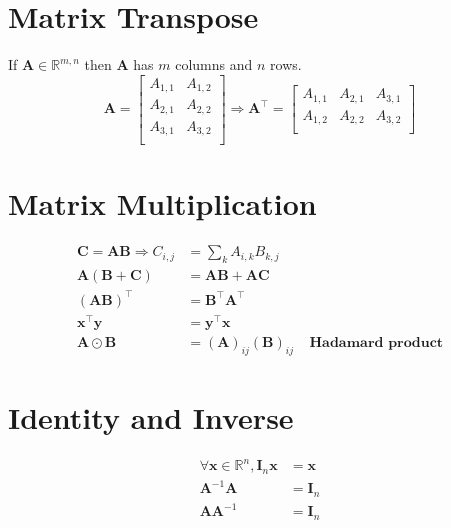 \documentclass[12pt]{report}
\begin{document}
    \section{Matrix Transpose}
        If $\boldsymbol{A} \in \mathbb{R}^{m, n}$ then $\boldsymbol{A}$ has $m$ columns and $n$ rows.
        \begin{equation}
            \boldsymbol{A} =
            \begin{bmatrix} 
                A_{1,1} & A_{1,2} \\
                A_{2,1} & A_{2,2}\\
                A_{3,1} & A_{3,2} \\
            \end{bmatrix} \Rightarrow
            \boldsymbol{A}^\top = 
            \begin{bmatrix} 
                A_{1,1} & A_{2,1} & A_{3,1} \\
                A_{1,2} & A_{2,2} & A_{3,2} \\
            \end{bmatrix}
        \end{equation}
    \section{Matrix Multiplication}
        \begin{align}
            \boldsymbol{C} = \boldsymbol{A}\boldsymbol{B} \Rightarrow C_{i,j} &= \sum_{k}{A_{i,k}B_{k,j}} \\
            \boldsymbol{A}(\boldsymbol{B} + \boldsymbol{C}) &= \boldsymbol{A}\boldsymbol{B} + \boldsymbol{A}\boldsymbol{C} \\[8pt]
            (\boldsymbol{A}\boldsymbol{B})^\top &= \boldsymbol{B}^\top \boldsymbol{A}^\top \\[8pt]
            \boldsymbol{x}^\top \boldsymbol{y} &= \boldsymbol{y}^\top \boldsymbol{x} \\[8pt]
            \boldsymbol{A}\odot \boldsymbol{B} &= (\boldsymbol{A})_{ij}(\boldsymbol{B})_{ij}~~~~~\textbf{Hadamard product}
        \end{align}
    \section{Identity and Inverse}
        \begin{align}
            \forall \boldsymbol{x} \in \mathbb{R}^{n}, \boldsymbol{I}_{n} \boldsymbol{x} &= \boldsymbol{x} \\
            \boldsymbol{A}^{-1} \boldsymbol{A} &= \boldsymbol{I}_n \\
             \boldsymbol{A} \boldsymbol{A}^{-1} &= \boldsymbol{I}_n
        \end{align}
\end{document}

